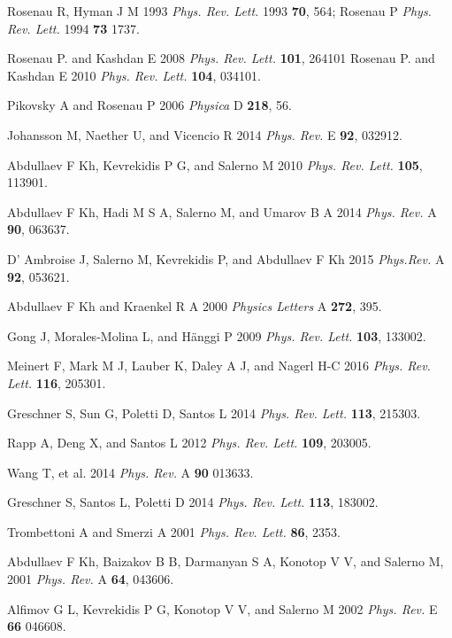 \documentclass[12pt]{iopart}
\begin{document}
\begin{thebibliography}{99}
 Rosenau R,  Hyman J M 1993 {\it Phys. Rev. Lett.} 1993 {\bf 70}, 564;  Rosenau P {\it Phys. Rev. Lett.} 1994 {\bf 73} 1737.

 Rosenau P. and Kashdan E 2008 {\it Phys. Rev. Lett.} {\bf 101}, 264101
Rosenau P. and Kashdan E 2010 {\it Phys. Rev. Lett.} {\bf 104}, 034101.

 Pikovsky A and  Rosenau P 2006 {\it Physica} D {\bf 218}, 56.

 Johansson M,  Naether U, and  Vicencio R 2014 {\it Phys. Rev.} E {\bf 92}, 032912.

 Abdullaev F Kh,  Kevrekidis P G, and  Salerno M 2010
{\it Phys. Rev. Lett.} \textbf{105}, 113901.

  Abdullaev F Kh,  Hadi M S A, Salerno M, and  Umarov B A 2014 {\it Phys. Rev.} A {\bf 90}, 063637.

  D' Ambroise J,  Salerno M,  Kevrekidis P, and  Abdullaev F Kh 2015 {\it Phys.Rev.} A {\bf 92}, 053621.

 Abdullaev F Kh and  Kraenkel R A 2000 {\it Physics Letters} A {\bf 272}, 395.

 Gong J,  Morales-Molina L, and  H\"anggi P
2009 {\it Phys. Rev. Lett.} \textbf{103}, 133002.

 Meinert F, Mark M J, Lauber K, Daley A J, and Nagerl
H-C 2016 \textit{Phys. Rev. Lett.} \textbf{116}, 205301.

 Greschner S,  Sun G, Poletti D,  Santos L 2014
{\it Phys. Rev. Lett.} {\bf 113}, 215303.

 Rapp A,  Deng X, and  Santos L 2012 {\it Phys. Rev. Lett.} \textbf{109},
203005.

  Wang T, et al. 2014 {\it Phys. Rev.} A \textbf{90} 013633.

 Greschner S, Santos L,  Poletti D 2014 {\it Phys. Rev. Lett.} {\bf 113}, 183002.

 Trombettoni A and  Smerzi A 2001 {\it Phys. Rev. Lett.} \textbf{86},
2353.

  Abdullaev F Kh,  Baizakov B B,  Darmanyan S A,
Konotop V V, and  Salerno M, 2001 {\it Phys. Rev.} A \textbf{64}, 043606.

 Alfimov G L,  Kevrekidis P G,  Konotop V V, and
Salerno M 2002 {\it Phys. Rev.} E \textbf{66} 046608.


\end{thebibliography}
\end{document}
